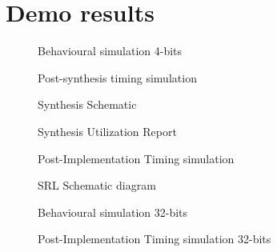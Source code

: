 \documentclass[CMPE]{../KGCOEReport}
\begin{document}
    \pagebreak
    \section*{Demo results}
    \begin{figure}[h!]
        \centering
        \caption{Behavioural simulation 4-bits}
        \label{fig:demo1}
    \end{figure}

    \begin{figure}[h!]
        \centering
        \caption{Post-synthesis timing simulation}
        \label{fig:demo2}
    \end{figure}
    \begin{figure}[h!]
        \centering
        \caption{Synthesis Schematic}
        \label{fig:demo3}
    \end{figure}
    \begin{figure}[h!]
        \centering
        \caption{Synthesis Utilization Report}
        \label{fig:demo4}
    \end{figure}
    \begin{figure}[h!]
        \centering
        \caption{Post-Implementation Timing simulation}
        \label{fig:demo5}
    \end{figure}
    \begin{figure}[h!]
        \centering
        \caption{SRL Schematic diagram}
        \label{fig:demo6}
    \end{figure}
    \begin{figure}[h!]
        \centering
        \caption{Behavioural simulation 32-bits}
        \label{fig:demo7}
    \end{figure}
    \begin{figure}[h!]
        \centering
        \caption{Post-Implementation Timing simulation 32-bits}
        \label{fig:demo8}
    \end{figure}
\end{document}
